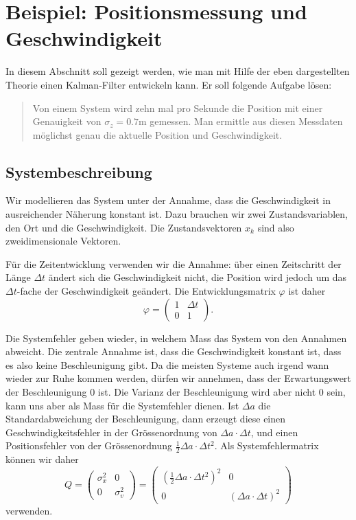 %
%
%

\section{Beispiel: Positionsmessung und Geschwindigkeit}
In diesem Abschnitt soll gezeigt werden, wie man mit Hilfe der
eben dargestellten Theorie einen Kalman-Filter entwickeln kann.
Er soll folgende Aufgabe lösen:
\begin{quote}
Von einem System wird zehn mal
pro Sekunde die Position mit einer Genauigkeit von $\sigma_z=0.7\text{m}$
gemessen.
Man ermittle aus diesen Messdaten möglichst genau die aktuelle Position
und Geschwindigkeit.
\end{quote}
\subsection{Systembeschreibung}
Wir modellieren das System unter der Annahme, dass die Geschwindigkeit in
ausreichender Näherung konstant ist.
Dazu brauchen wir zwei Zustandsvariablen, den Ort und die Geschwindigkeit.
Die Zustandsvektoren $x_k$ sind also zweidimensionale Vektoren.

Für die Zeitentwicklung verwenden wir die Annahme: über einen Zeitschritt
der Länge $\Delta t$
ändert sich die Geschwindigkeit nicht, die Position wird jedoch 
um das $\Delta t$-fache der Geschwindigkeit geändert.
Die Entwicklungsmatrix $\varphi$ ist daher
\[
\varphi=\begin{pmatrix}
1&\Delta t\\
0&1
\end{pmatrix}.
\]

Die Systemfehler geben wieder, in welchem Mass das System von den Annahmen
abweicht.
Die zentrale Annahme ist, dass die Geschwindigkeit konstant ist, dass es
also keine Beschleunigung gibt.
Da die meisten Systeme auch irgend wann wieder zur Ruhe kommen werden,
dürfen wir annehmen, dass der Erwartungswert der Beschleunigung $0$ ist.
Die Varianz der Beschleunigung wird aber nicht 0 sein, kann uns aber als
Mass für die Systemfehler dienen.
Ist $\Delta a$ die Standardabweichung der Beschleunigung, dann erzeugt
diese einen Geschwindigkeitsfehler in der Grössenordnung von
$\Delta a\cdot \Delta t$, und einen Positionsfehler von der Grössenordnung
$\frac12\Delta a\cdot\Delta t^2$.
Als Systemfehlermatrix können wir daher 
\[
Q=
\begin{pmatrix}
\sigma_x^2&0\\
0&\sigma_v^2
\end{pmatrix}
=
\begin{pmatrix}
(\frac12\Delta a\cdot\Delta t^2)^2&0\\
0&(\Delta a\cdot\Delta t)^2
\end{pmatrix}
\]
verwenden.

